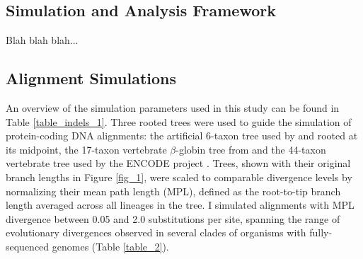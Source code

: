 \subsection{Simulation and Analysis Framework}

Blah blah blah...

\subsection{Alignment Simulations}

An overview of the simulation parameters used in this study can be
found in Table \ref{table_indels_1}. Three rooted trees were used to
guide the simulation of protein-coding DNA alignments: the artificial
6-taxon tree used by \citet{Anisimova2001} and
\citet{Massingham2005} rooted at its midpoint, the 17-taxon
vertebrate $\beta$-globin tree from \citet{Yang2000CodonSubstitution}
and the 44-taxon vertebrate tree used by the ENCODE project
\citep{Birney2007,Nikolaev2007}. Trees, shown with their original
branch lengths in Figure \ref{fig_1}, were scaled to comparable
divergence levels by normalizing their mean path length (MPL), defined
as the root-to-tip branch length averaged across all lineages in the
tree. I simulated alignments with MPL divergence between 0.05 and 2.0
\syn substitutions per \syn site, spanning the range of evolutionary
divergences observed in several clades of organisms with
fully-sequenced genomes (Table \ref{table_2}).

